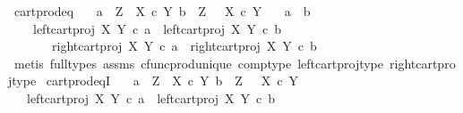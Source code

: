 \begin{isabellebody}
%
\endisatagproof
{\isafoldproof}%
%
\isadelimproof
\isanewline
%
\endisadelimproof
\isanewline
{}\isamarkupfalse%
\ cart{\isacharunderscore}{\kern0pt}prod{\isacharunderscore}{\kern0pt}eq{\isacharcolon}{\kern0pt}\isanewline
\ \ \ {\isachardoublequoteopen}a\ {\isacharcolon}{\kern0pt}\ Z\ {\isasymrightarrow}\ X\ {\isasymtimes}\isactrlsub c\ Y{\isachardoublequoteclose}\ {\isachardoublequoteopen}b\ {\isacharcolon}{\kern0pt}\ Z\ {\isasymrightarrow}\ \ X\ {\isasymtimes}\isactrlsub c\ Y{\isachardoublequoteclose}\isanewline
\ \ \ {\isachardoublequoteopen}a\ {\isacharequal}{\kern0pt}\ b\ {\isasymlongleftrightarrow}\ \isanewline
\ \ \ \ {\isacharparenleft}{\kern0pt}left{\isacharunderscore}{\kern0pt}cart{\isacharunderscore}{\kern0pt}proj\ X\ Y\ {\isasymcirc}\isactrlsub c\ a\ {\isacharequal}{\kern0pt}\ left{\isacharunderscore}{\kern0pt}cart{\isacharunderscore}{\kern0pt}proj\ X\ Y\ {\isasymcirc}\isactrlsub c\ b\ \isanewline
\ \ \ \ \ \ {\isasymand}\ right{\isacharunderscore}{\kern0pt}cart{\isacharunderscore}{\kern0pt}proj\ X\ Y\ {\isasymcirc}\isactrlsub c\ a\ {\isacharequal}{\kern0pt}\ right{\isacharunderscore}{\kern0pt}cart{\isacharunderscore}{\kern0pt}proj\ X\ Y\ {\isasymcirc}\isactrlsub c\ b{\isacharparenright}{\kern0pt}{\isachardoublequoteclose}\isanewline
%
\isadelimproof
\ \ %
\endisadelimproof
%
\isatagproof
{}\isamarkupfalse%
\ {\isacharparenleft}{\kern0pt}metis\ {\isacharparenleft}{\kern0pt}full{\isacharunderscore}{\kern0pt}types{\isacharparenright}{\kern0pt}\ assms\ cfunc{\isacharunderscore}{\kern0pt}prod{\isacharunderscore}{\kern0pt}unique\ comp{\isacharunderscore}{\kern0pt}type\ left{\isacharunderscore}{\kern0pt}cart{\isacharunderscore}{\kern0pt}proj{\isacharunderscore}{\kern0pt}type\ right{\isacharunderscore}{\kern0pt}cart{\isacharunderscore}{\kern0pt}proj{\isacharunderscore}{\kern0pt}type{\isacharparenright}{\kern0pt}%
\endisatagproof
{\isafoldproof}%
%
\isadelimproof
\isanewline
%
\endisadelimproof
\isanewline
{}\isamarkupfalse%
\ cart{\isacharunderscore}{\kern0pt}prod{\isacharunderscore}{\kern0pt}eqI{\isacharcolon}{\kern0pt}\isanewline
\ \ \ {\isachardoublequoteopen}a\ {\isacharcolon}{\kern0pt}\ Z\ {\isasymrightarrow}\ X\ {\isasymtimes}\isactrlsub c\ Y{\isachardoublequoteclose}\ {\isachardoublequoteopen}b\ {\isacharcolon}{\kern0pt}\ Z\ {\isasymrightarrow}\ \ X\ {\isasymtimes}\isactrlsub c\ Y{\isachardoublequoteclose}\isanewline
\ \ \ {\isachardoublequoteopen}{\isacharparenleft}{\kern0pt}left{\isacharunderscore}{\kern0pt}cart{\isacharunderscore}{\kern0pt}proj\ X\ Y\ {\isasymcirc}\isactrlsub c\ a\ {\isacharequal}{\kern0pt}\ left{\isacharunderscore}{\kern0pt}cart{\isacharunderscore}{\kern0pt}proj\ X\ Y\ {\isasymcirc}\isactrlsub c\ b\ \isanewline

\end{isabellebody}
